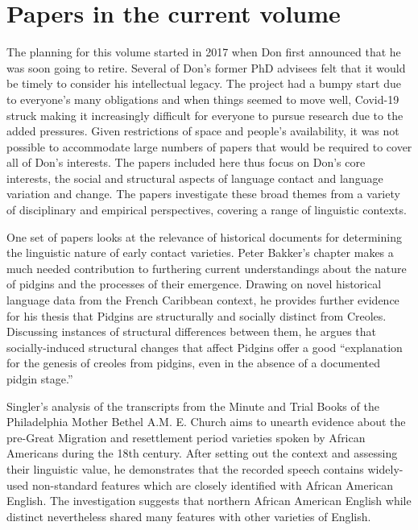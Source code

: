\documentclass[output=paper, colorlinks,citecolor=brown]{langscibook}
\begin{document}

\section {Papers in the current volume}

The planning for this volume started in 2017 when Don first announced that he was soon going to retire. Several of Don’s former PhD advisees felt that it would be timely to consider his intellectual legacy. The project had a bumpy start due to everyone’s many obligations and when things seemed to move well, Covid-19 struck making it increasingly difficult for everyone to pursue research due to the added pressures. Given restrictions of space and people’s availability, it was not possible to accommodate large numbers of papers that would be required to cover all of Don’s interests. The papers included here thus focus on Don’s core interests, the social and structural aspects of language contact and language variation and change. The papers investigate these broad themes from a variety of disciplinary and empirical perspectives, covering a range of linguistic contexts. 

One set of papers looks at the relevance of historical documents for determining the linguistic nature of early contact varieties. Peter Bakker’s chapter makes a much needed contribution to furthering current understandings about the nature of pidgins and the processes of their emergence. Drawing on novel historical language data from the French Caribbean context, he provides further evidence for his thesis that Pidgins are structurally and socially distinct from Creoles. Discussing instances of structural differences between them, he argues that socially-induced structural changes that affect Pidgins offer a good “explanation for the genesis of creoles from pidgins, even in the absence of a documented pidgin stage.” 

Singler’s analysis of the transcripts from the Minute and Trial Books of the Philadelphia Mother Bethel A.M. E. Church aims to unearth evidence about the pre-Great Migration and resettlement period varieties spoken by African Americans during the 18th century. After setting out the context and assessing their linguistic value, he demonstrates that the recorded speech contains widely-used non-standard features which are closely identified with African American English. The investigation suggests that northern African American English while distinct nevertheless shared many features with other varieties of English. 
\end{document}
